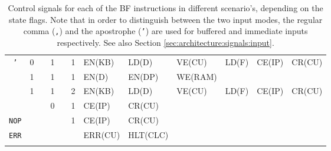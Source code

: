 \begin{longtable}[c] {c|cccc|c|llllll}
    \rowcolor{Gray}  \texttt{'}   & 0 &   & 1     &      & 1     & EN(KB)   & LD(D)    & VE(CU)  & LD(F)  & CE(IP) & CR(CU) \\
    \rowcolor{White}              & 1 &   & 1     &      & 1     & EN(D)    & EN(DP)   & WE(RAM) &        &        &        \\
    \rowcolor{White}              & 1 &   & 1     &      & 2     & EN(KB)   & LD(D)    & VE(CU)  & LD(F)  & CE(IP) & CR(CU) \\
    \rowcolor{Gray}               &   &   & 0     &      & 1     & CE(IP)   & CR(CU)   &         &        &        &        \\ \hline
    \rowcolor{White} \texttt{NOP} &   &   &       &      & 1     & CE(IP)   & CR(CU)   &         &        &        &        \\ \hline
    \rowcolor{Gray}  \texttt{ERR} &   &   &       &      &       & ERR(CU)  & HLT(CLC) &         &        &        &        \\ \hline

    \caption{Control signals for each of the BF instructions in different scenario's, depending on the state flags. Note that in order to distinguish between the two input modes, the regular comma (\texttt{,}) and the apostrophe (\texttt{'}) are used for buffered and immediate inputs respectively. See also Section \ref{sec:architecture:signals:input}.}
    \label{tab:microcode}
  \end{longtable}
